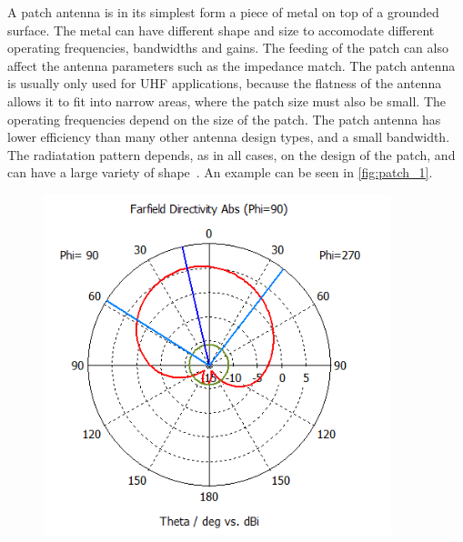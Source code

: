A patch antenna is in its simplest form a piece of metal on top of a grounded surface. The metal can have different shape and size to accomodate different operating frequencies, bandwidths and gains. The feeding of the patch can also affect the antenna parameters such as the impedance match. The patch antenna is usually only used for UHF applications, because the flatness of the antenna allows it to fit into narrow areas, where the patch size must also be small. The operating frequencies depend on the size of the patch. The patch antenna has lower efficiency than many other antenna design types, and a small bandwidth. The radiatation pattern depends, as in all cases, on the design of the patch, and can have a large variety of shape~\cite[p. 7.1-7.5]{ant_eng_hk}. An example can be seen in \ref{fig:patch_1}.
\begin{figure}[H]
    \begin{minipage}{0.45\textwidth}
        \centering
        \includegraphics[width=0.9\textwidth]{figures/farfield (f=2.4) patch.png} %
    \end{minipage}\hfill
    \begin{minipage}{0.45\textwidth}
        \centering

\end{minipage}
\end{figure}

